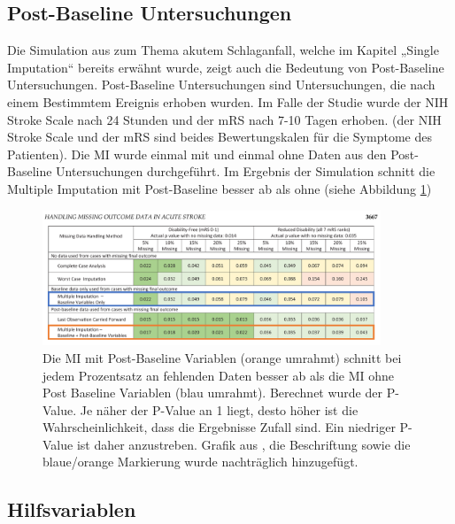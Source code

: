 \subsection{Post-Baseline Untersuchungen}

Die Simulation aus \textcite[]{Young-Saver2018} zum Thema akutem Schlaganfall, welche im Kapitel „Single Imputation“ 
bereits erwähnt wurde, zeigt auch die Bedeutung von Post-Baseline Untersuchungen. Post-Baseline Untersuchungen sind
 Untersuchungen, die nach einem Bestimmtem Ereignis erhoben wurden. Im Falle der Studie wurde der NIH Stroke Scale 
 nach 24 Stunden und der mRS nach 7-10 Tagen erhoben. (der NIH Stroke Scale und der mRS sind beides Bewertungskalen
  für die Symptome des Patienten). Die MI wurde einmal mit und einmal ohne Daten aus den Post-Baseline Untersuchungen 
  durchgeführt. Im Ergebnis der Simulation schnitt die Multiple Imputation mit Post-Baseline besser ab als ohne (siehe Abbildung \ref{figure:study})

  \begin{figure}[t]
	\centering
	\includegraphics[width=0.9\textwidth]{images/grafik_saver.png}
	\caption{
		Die MI mit Post-Baseline Variablen (orange umrahmt) schnitt bei jedem Prozentsatz an fehlenden Daten besser ab als 
		die MI ohne Post Baseline Variablen (blau umrahmt). Berechnet wurde der P-Value. Je näher der P-Value an 1 liegt, 
		desto höher ist die Wahrscheinlichkeit, dass die Ergebnisse Zufall sind. Ein niedriger P-Value ist daher anzustreben. 
		Grafik aus \textcite[3667]{Young-Saver2018}, die Beschriftung sowie die blaue/orange Markierung wurde nachträglich 
		hinzugefügt.
	}
	\label{figure:study}
\end{figure}

\subsection{Hilfsvariablen}

